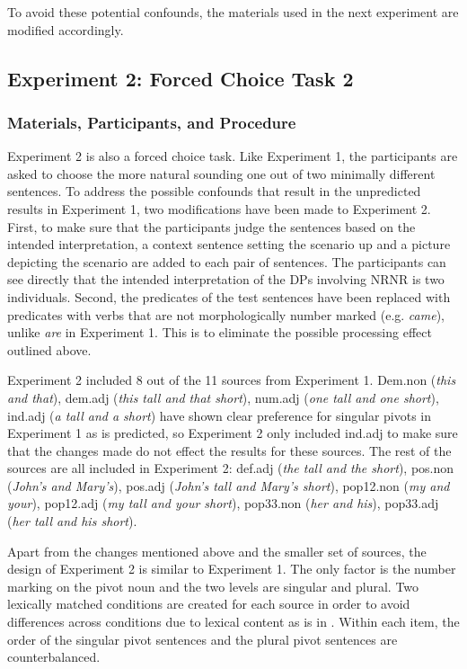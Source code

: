 \documentclass[
  11pt          %
  ,letterpaper  %
  ,center       %
  ,noupper      %
  ]{uconnthesis2}
\begin{document}
To avoid these potential confounds, the materials used in the next experiment are modified accordingly.

\subsection{Experiment 2: Forced Choice Task 2}

\subsubsection{Materials, Participants, and Procedure}  

Experiment 2 is also a forced choice task. Like Experiment 1, the participants are asked to choose the more natural sounding one out of two minimally different sentences. To address the possible confounds that result in the unpredicted results in Experiment 1, two modifications have been made to Experiment 2.  First, to make sure that the participants judge the sentences based on the intended interpretation,  a context sentence setting the scenario up and a picture depicting the scenario are added to each pair of sentences. The participants can see directly that the intended interpretation of the DPs involving NRNR is two individuals. Second, the predicates of the test sentences have been replaced with predicates with verbs that are not morphologically number marked (e.g. \textit{came}), unlike \textit{are} in Experiment 1. This is to eliminate the possible processing effect outlined above.

Experiment 2 included 8 out of the 11 sources from Experiment 1. Dem.non (\textit{this and that}), dem.adj (\textit{this tall and that short}), num.adj (\textit{one tall and one short}), ind.adj (\textit{a tall and a short}) have shown clear preference for singular pivots in Experiment 1 as is predicted, so Experiment 2 only included ind.adj to make sure that the changes made do not effect the results for these sources. The rest of the sources are all included in Experiment 2: def.adj (\textit{the tall and the short}), pos.non (\textit{John's and Mary's}), pos.adj (\textit{John's tall and Mary's short}), pop12.non (\textit{my and your}), pop12.adj (\textit{my tall and your short}), pop33.non (\textit{her and his}), pop33.adj (\textit{her tall and his short}). 

Apart from the changes mentioned above and the smaller set of sources, the design of Experiment 2 is similar to Experiment 1. The only factor is the number marking on the pivot noun and the two levels are singular and plural. Two lexically matched conditions are created for each source in order to avoid differences across conditions due to lexical content as is in \Next. Within each item, the order of the singular pivot sentences and the plural pivot sentences are counterbalanced. 
\end{document}
